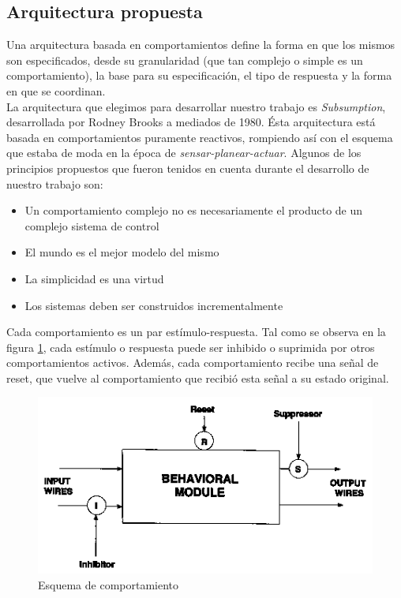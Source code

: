 \newpage
\subsection{Arquitectura propuesta}
\label{arq_prop}
Una arquitectura basada en comportamientos define la forma en que los mismos
son especificados, desde su granularidad (que tan complejo o simple es un
comportamiento), la base para su especificaci\'on, el tipo de respuesta y la
forma en que se coordinan.
\\
La arquitectura que elegimos para desarrollar nuestro trabajo es
\emph{Subsumption}, desarrollada por Rodney Brooks a mediados de 1980.
\'Esta arquitectura est\'a basada en comportamientos puramente reactivos,
rompiendo as\'i con el esquema que estaba de moda en la \'epoca de
\emph{sensar-planear-actuar}. Algunos de los principios propuestos que fueron
tenidos en cuenta durante el desarrollo de nuestro trabajo son:
\begin{itemize}
\item{}Un comportamiento complejo no es necesariamente el producto de un
complejo sistema de control
\item{}El mundo es el mejor modelo del mismo
\item{}La simplicidad es una virtud
\item{}Los sistemas deben ser construidos incrementalmente
\end{itemize}
Cada comportamiento es un par est\'imulo-respuesta. Tal como se observa en la
figura \ref{fig:behaviour}, cada est\'imulo o respuesta puede ser inhibido o
suprimida por otros comportamientos activos. Adem\'as, cada comportamiento
recibe una se\~nal de reset, que vuelve al comportamiento que recibi\'o
esta se\~nal a su estado original.
\begin{figure}[htp]
\begin{center}
\includegraphics[scale=0.85]{comportamientos/behaviour.png}
\caption{Esquema de comportamiento}
\label{fig:behaviour}
\end{center}
\end{figure}
